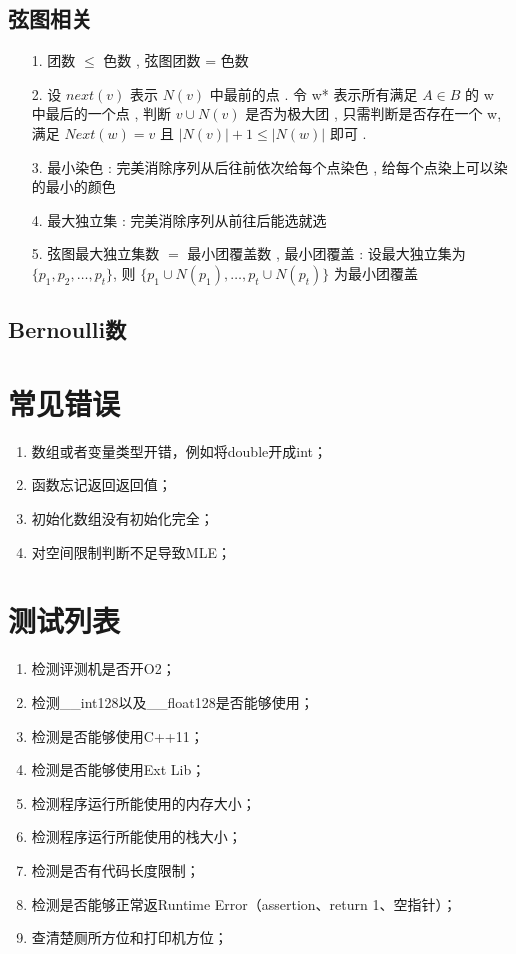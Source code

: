 \documentclass[a4paper,openany]{book}
\begin{document}
\begin{spacing}{0.9}
			\subsection{弦图相关}
			\begin{enumerate}
				\item[1.] 团数 $\leq$ 色数 , 弦图团数 = 色数
				\item[2.] 设 $next(v)$ 表示 $N(v)$ 中最前的点 . 
				令 w* 表示所有满足 $A \in B$ 的 w 中最后的一个点 , 
				判断 $v \cup N(v)$ 是否为极大团 , 
				只需判断是否存在一个 w, 
				满足 $Next(w)=v$ 且 $|N(v)| + 1 \leq |N(w)|$ 即可 . 
				\item[3.] 最小染色 : 完美消除序列从后往前依次给每个点染色 , 
				给每个点染上可以染的最小的颜色
				\item[4.] 最大独立集 : 完美消除序列从前往后能选就选
				\item[5.] 弦图最大独立集数 $=$ 最小团覆盖数 , 
				最小团覆盖 : 
				设最大独立集为 $\{p_1,p_2, \dots ,p_t\}$, 
				则 $\{p_1\cup N(p_1), \dots , p_t \cup N(p_t)\}$ 
				为最小团覆盖
			\end{enumerate}
			\subsection{Bernoulli数}
				
		\section{常见错误}
		\begin{spacing}{0.6}
		\begin{enumerate}
			\item 数组或者变量类型开错，例如将double开成int；
			\item 函数忘记返回返回值；
			\item 初始化数组没有初始化完全；
			\item 对空间限制判断不足导致MLE；
		\end{enumerate}
		\end{spacing}
		\section{测试列表}
		\begin{spacing}{0.6}
		\begin{enumerate}
			\item 检测评测机是否开O2；
			\item 检测\_\_int128以及\_\_float128是否能够使用；
			\item 检测是否能够使用C++11；
			\item 检测是否能够使用Ext Lib；
			\item 检测程序运行所能使用的内存大小；
			\item 检测程序运行所能使用的栈大小；
			\item 检测是否有代码长度限制；
			\item 检测是否能够正常返Runtime Error（assertion、return 1、空指针）；
			\item 查清楚厕所方位和打印机方位；
		\end{enumerate}
		\end{spacing}

\end{spacing}
\end{document}
